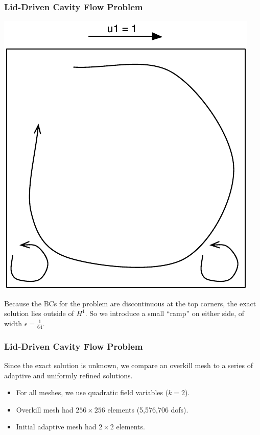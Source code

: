 \documentclass[mathserif]{beamer}
\begin{document}
\begin{frame}
\frametitle{Lid-Driven Cavity Flow Problem}
\begin{center}
{\includegraphics[scale=0.40]{../figures/cavity_flow_cartoon.pdf}}
\end{center}
\small{Because the BCs for the problem are discontinuous at the top corners, the exact solution lies outside of $H^{1}$.  So we introduce a small ``ramp'' on either side, of width $\epsilon = \frac{1}{64}$.}
\end{frame}

\begin{frame}
\frametitle{Lid-Driven Cavity Flow Problem}
Since the exact solution is unknown, we compare an overkill mesh to a series of adaptive and uniformly refined solutions.\\

\begin{itemize}
\item For all meshes, we use quadratic field variables ($k=2$).
\item Overkill mesh had $256 \times 256$ elements (5,576,706 dofs).
\item Initial adaptive mesh had $2 \times 2$ elements.
\end{itemize}
\end{frame}
\end{document}
